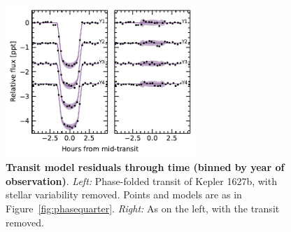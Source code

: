 \documentclass[12pt,modern,twocolumn,tighten]{aastex63}
\begin{document}
\begin{figure}[t]
	\begin{center}
		\leavevmode
		\includegraphics[width=0.64\textwidth]{f10.pdf}
	\end{center}
	\vspace{-0.7cm}
	\caption{
    {\bf Transit model residuals through time (binned by year of observation)}.  
    {\it Left:}
    Phase-folded transit of Kepler 1627b, with stellar variability
    removed.  Points and models are as
    in Figure~\ref{fig:phasequarter}.
    {\it Right:}
    As on the left, with the transit removed.
		\label{fig:phaseyear}
	}
\end{figure}
\end{document}
